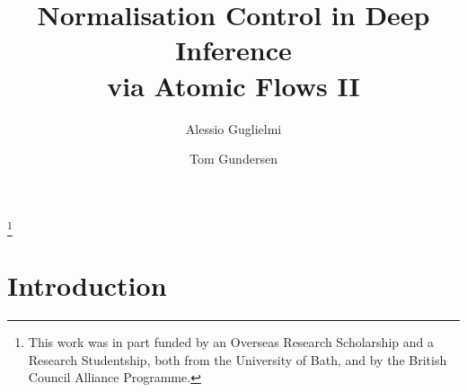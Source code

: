 \documentclass[a4paper]{amsart}
\newif\iflmcs\lmcsfalse %
\theoremstyle{remark}
\theoremstyle{definition}
\begin{document}
\title[Normalisation Control in Deep Inference   via Atomic Flows II]
      {Normalisation Control in Deep Inference\\ via Atomic Flows II}

\author{Alessio Guglielmi}
\address{University of Bath, Bath BA2 7AY, UK}

\author{Tom Gundersen}
\iflmcs\address{University of Bath, Bath BA2 7AY, UK}\fi

\thanks{This work was in part funded by an Overseas Research Scholarship and a Research Studentship, both from the University of Bath, and by the British Council Alliance Programme.}



\begin{abstract}
\end{abstract}

\maketitle

\section{Introduction}
\newcommand{\ot}{\mathbin\shortleftarrow}
\newcommand{\fff}{\mathsf f}
\newcommand{\ttt}{\mathsf t}
\newcommand{\ai}{\mathsf{ai}}
\newcommand{\aw}{\mathsf{aw}}
\newcommand{\ac}{\mathsf{ac}}
\newcommand{\aid}{{\ai{\downarrow}}}
\newcommand{\awd}{{\aw{\downarrow}}}
\newcommand{\acd}{{\ac{\downarrow}}}
\newcommand{\aiu}{{\ai{\uparrow}}}
\newcommand{\awu}{{\aw{\uparrow}}}
\newcommand{\acu}{{\ac{\uparrow}}}
\newcommand{\swi}{\mathsf{s}}
\newcommand{\med}{\mathsf{m}}
\newcommand{\sus}{\mathsf{ss}}
\newcommand{\said}{\mathsf{s}\aid}
\newcommand{\contr}{\mathsf{c}}
\newcommand{\cod}{{\contr{\downarrow}}}
\newcommand{\cou}{{\contr{\uparrow}}}
\newcommand{\SKS}{\mathsf{SKS}}
\newcommand{\ppl  }{{\mathchoice{\scriptstyle+}
                                {\scriptstyle+}
                                {\scriptstyle+}
                                {\scriptscriptstyle+}}}
\newcommand{\pmi  }{{\mathchoice{\scriptstyle-}
                                {\scriptstyle-}
                                {\scriptstyle-}
                                {\scriptscriptstyle-}}}
\end{document}
